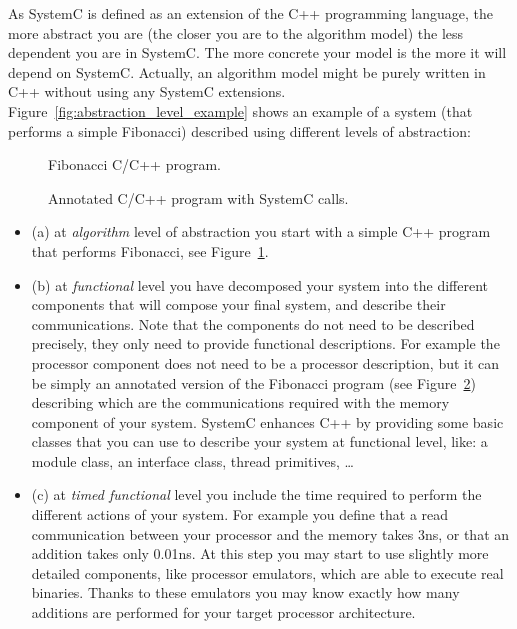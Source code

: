 {As SystemC is defined as an extension of the C++ programming language, the more abstract you are (the closer you are to the algorithm model) the less dependent you are in SystemC.
The more concrete your model is the more it will depend on SystemC. 
Actually, an algorithm model might be purely written in C++ without using any SystemC extensions.
Figure~\ref{fig:abstraction_level_example} shows an example of a system (that performs a simple Fibonacci) described using different levels of abstraction:
\begin{figure}[h]
	
	\caption{Fibonacci C/C++ program.}
	\label{fig:fibonacci_cpp_program}
\end{figure}
\begin{figure}[h]
	
	\caption{Annotated C/C++ program with SystemC calls.}
	\label{fig:annotated_fibonacci_cpp_program}
\end{figure}
\begin{itemize}
	\item (a) at \emph{algorithm} level of abstraction you start with a simple C++ program that performs Fibonacci, see Figure~\ref{fig:fibonacci_cpp_program}.
	\item (b) at \emph{functional} level you have decomposed your system into the different components that will compose your final system, and describe their communications.
		Note that the components do not need to be described precisely, they only need to provide functional descriptions.
		For example the processor component does not need to be a processor description, but it can be simply an annotated version of the Fibonacci program (see Figure~\ref{fig:annotated_fibonacci_cpp_program}) describing which are the communications required with the memory component of your system.
		SystemC enhances C++ by providing some basic classes that you can use to describe your system at functional level, like: a module class, an interface class, thread primitives, \ldots
	\item (c) at \emph{timed functional} level you include the time required to perform the different actions of your system.
		For example you define that a read communication between your processor and the memory takes 3ns, or that an addition takes only 0.01ns.
		At this step you may start to use slightly more detailed components, like processor emulators, which are able to execute real binaries.
		Thanks to these emulators you may know exactly how many additions are performed for your target processor architecture.

\end{itemize}}
